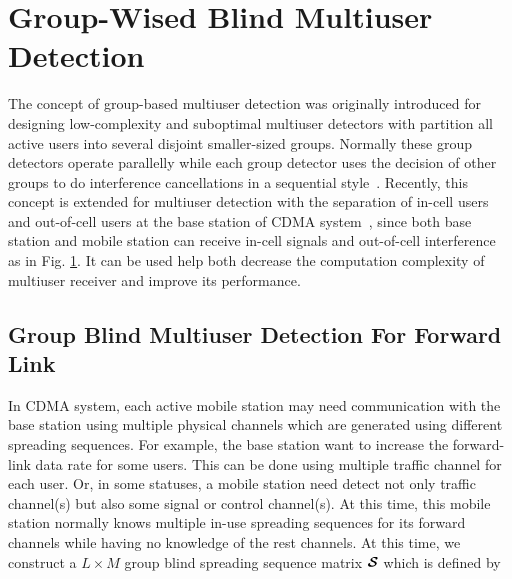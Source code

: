 \documentclass[a4paper,11pt,fleqn]{article}
\newcommand{\bcS}{{\mbox {\boldmath ${\cal S}$}}}
\begin{document}
\pagebreak




\section{Group-Wised Blind Multiuser Detection\label{GroupMUD}}
The concept of group-based multiuser detection was originally
introduced for designing low-complexity and suboptimal multiuser
detectors with partition all active users into several disjoint
smaller-sized groups. Normally these group detectors operate
parallelly while each group detector uses the decision of other
groups to do interference cancellations in a sequential
style~\cite{Mahesh95}. Recently, this concept is extended for
multiuser detection with the separation of in-cell users and
out-of-cell users at the base station of CDMA
system~\cite{Wang99A}, since both base station and mobile station
can receive in-cell signals and out-of-cell interference as in
Fig. \ref{CDMA_grouplinks}. It can be used help both decrease the
computation complexity of multiuser receiver and improve its
performance.

\begin{figure}
\label{CDMA_grouplinks}
\end{figure}


\subsection{Group Blind Multiuser Detection For Forward Link}
In CDMA system, each active mobile station may need communication
with the base station using multiple physical channels which are
generated using different spreading sequences. For example, the
base station want to increase the forward-link data rate for some
users. This can be done using multiple traffic channel for each
user. Or, in some statuses, a mobile station need detect not only
traffic channel(s) but also some signal or control channel(s). At
this time, this mobile station normally knows multiple in-use
spreading sequences for its forward channels while having no
knowledge of the rest channels. At this time, we construct a
$L\times M$ group blind spreading sequence matrix $\bcS$ which is
defined by
\end{document}
